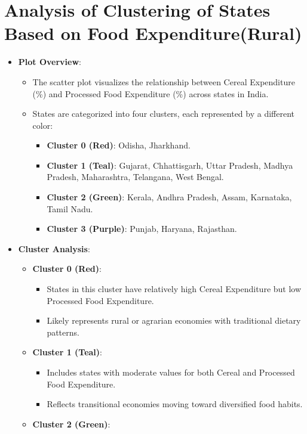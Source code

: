 \documentclass{article}
\begin{document}
\section{Analysis of Clustering of States Based on Food Expenditure(Rural)}

\begin{itemize}
	\item \textbf{Plot Overview}: 
	\begin{itemize}
		\item The scatter plot visualizes the relationship between Cereal Expenditure (\%) and Processed Food Expenditure (\%) across states in India.
		\item States are categorized into four clusters, each represented by a different color: 
		\begin{itemize}
			\item \textbf{Cluster 0 (Red)}: Odisha, Jharkhand.
			\item \textbf{Cluster 1 (Teal)}: Gujarat, Chhattisgarh, Uttar Pradesh, Madhya Pradesh, Maharashtra, Telangana, West Bengal.
			\item \textbf{Cluster 2 (Green)}: Kerala, Andhra Pradesh, Assam, Karnataka, Tamil Nadu.
			\item \textbf{Cluster 3 (Purple)}: Punjab, Haryana, Rajasthan.
		\end{itemize}
	\end{itemize}
	\item \textbf{Cluster Analysis}:
	\begin{itemize}
		\item \textbf{Cluster 0 (Red)}:
		\begin{itemize}
			\item States in this cluster have relatively high Cereal Expenditure but low Processed Food Expenditure.
			\item Likely represents rural or agrarian economies with traditional dietary patterns.
		\end{itemize}
		\item \textbf{Cluster 1 (Teal)}:
		\begin{itemize}
			\item Includes states with moderate values for both Cereal and Processed Food Expenditure.
			\item Reflects transitional economies moving toward diversified food habits.
		\end{itemize}
		\item \textbf{Cluster 2 (Green)}:
		\begin{itemize}

\end{itemize}
\end{itemize}
\end{itemize}
\end{document}
